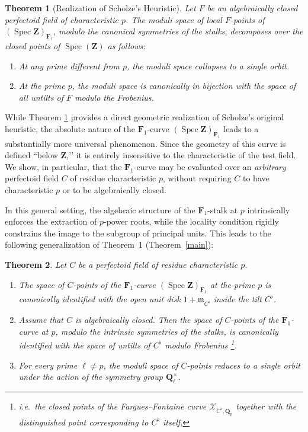 \documentclass[11pt,a4paper]{article}
\newtheorem{thm}{Theorem}
\newcommand{\Q}{\mathbf{Q}}
\newcommand{\Z}{\mathbf{Z}}
\newcommand{\Fone}{\mathbf{F}_{1}}
\def\spzf{(\Spec \Z)_{\mathbf{F}_{1}}}
\newcommand{\Spec}{\operatorname{Spec}}
\def\ie{{\it i.e.\/}\ }
\begin{document}
\begin{thm}[Realization of Scholze’s Heuristic]\label{scholze_heuristic0}
Let $F$ be an algebraically closed perfectoid field of characteristic $p$. The moduli space of local $F$-points of $\spzf$, modulo the canonical symmetries of the stalks, decomposes over the closed points of $\Spec(\Z)$ as follows:
\begin{enumerate}
\item At any prime different from $p$, the moduli space collapses to a single orbit.
\item   At the prime $p$, the moduli space is canonically in bijection with the space of all untilts of $F$ modulo the Frobenius.
\end{enumerate}
\end{thm}
While Theorem \ref{scholze_heuristic0} provides a direct geometric realization of Scholze’s original heuristic, the absolute nature of the $\Fone$-curve $\spzf$ leads to a substantially more universal phenomenon. Since the geometry of this curve is defined ``below $\Z$,’’ it is entirely insensitive to the characteristic of the test field. We show, in particular, that the $\Fone$-curve may be evaluated over an \emph{arbitrary} perfectoid field $C$ of residue characteristic $p$, without requiring $C$ to have characteristic $p$ or to be algebraically closed.
 

In this general setting, the algebraic structure of the $\Fone$-stalk at $p$ intrinsically enforces the extraction of $p$-power roots, while the locality condition rigidly constrains the image to the subgroup of principal units. This leads to the following generalization of Theorem~1 (Theorem~\ref{main}):


\begin{thm}
Let $C$ be a perfectoid field of residue characteristic $p$.
\begin{enumerate}
\item The space of $C$-points of the $\Fone$-curve $\spzf$ at the prime $p$ is canonically identified with the open unit disk
$1+\mathfrak m_{C^\flat}$
inside the tilt $C^\flat$.

\item Assume that $C$ is algebraically closed. Then the space of $C$-points of the $\Fone$-curve at $p$, modulo the intrinsic symmetries of the stalks, is canonically identified with the space of untilts of $C^\flat$ modulo Frobenius \footnote{\ie the closed points of the Fargues--Fontaine curve $\mathcal X_{C^\flat,\Q_p}$ together with the distinguished point corresponding to $C^\flat$ itself.}. 
\item For every prime $\ell\neq p$, the moduli space of $C$-points reduces to a single orbit under the action of the symmetry group $\Q_\ell^\times$.

\end{enumerate}
\end{thm}
\end{document}
